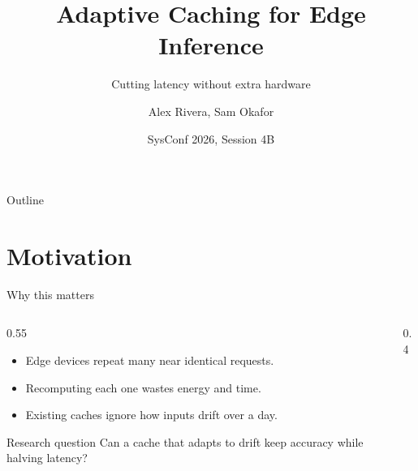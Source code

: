 \documentclass[aspectratio=169]{beamer}
\title[Adaptive Caching]{Adaptive Caching for Edge Inference}
\subtitle{Cutting latency without extra hardware}
\author[A. Rivera]{Alex Rivera, Sam Okafor}
\institute[Northfield Univ.]{Systems Lab, Northfield University}
\date[SysConf 2026]{SysConf 2026, Session 4B}
\begin{document}
\begin{frame}
  \titlepage
\end{frame}

\begin{frame}{Outline}
  \tableofcontents
\end{frame}

\section{Motivation}
\begin{frame}{Why this matters}
  \begin{columns}[T]
    \begin{column}{0.55\textwidth}
      \begin{itemize}
        \item Edge devices repeat many near identical requests.
        \item Recomputing each one wastes energy and time.
        \item Existing caches ignore how inputs drift over a day.
      \end{itemize}
      \vspace{1em}
      \begin{alertblock}{Research question}
        Can a cache that adapts to drift keep accuracy while halving latency?
      \end{alertblock}
    \end{column}
    \begin{column}{0.4\textwidth}
      \centering
    \end{column}
  \end{columns}
\end{frame}
\end{document}
